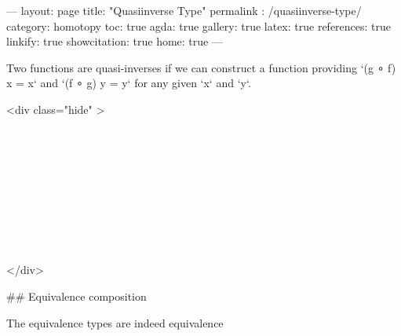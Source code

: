 ---
layout: page
title: "Quasiinverse Type"
permalink : /quasiinverse-type/
category: homotopy
toc: true
agda: true
gallery: true
latex: true
references: true
linkify: true
showcitation: true
home: true
---

Two functions are quasi-inverses if we can construct a function providing
`(g ∘ f) x = x` and `(f ∘ g) y = y` for any given `x` and `y`.

<div class="hide" >
\begin{code}%
\>[0]\AgdaSymbol{\{-\#}\AgdaSpace{}%
\AgdaSpace{}%
\AgdaSpace{}%
\AgdaSymbol{\#-\}}\<%
\\
\>[0]\AgdaSpace{}%
\AgdaSpace{}%
\<%
\\
\>[0]\AgdaSpace{}%
\AgdaSpace{}%
\<%
\\
%
\\[\AgdaEmptyExtraSkip]%
\>[0]\AgdaSpace{}%
\AgdaSpace{}%
\<%
\\
\>[0]\AgdaSpace{}%
\AgdaSpace{}%
\<%
\\
%
\\[\AgdaEmptyExtraSkip]%
\>[0]\AgdaSpace{}%
\AgdaSpace{}%
\<%
\\
\>[0]\AgdaSpace{}%
\AgdaSpace{}%
\<%
\end{code}
</div>

## Equivalence composition

\begin{code}%
\>[0]\AgdaSpace{}%
\AgdaSpace{}%
\<%
\end{code}

The equivalence types are indeed equivalence

